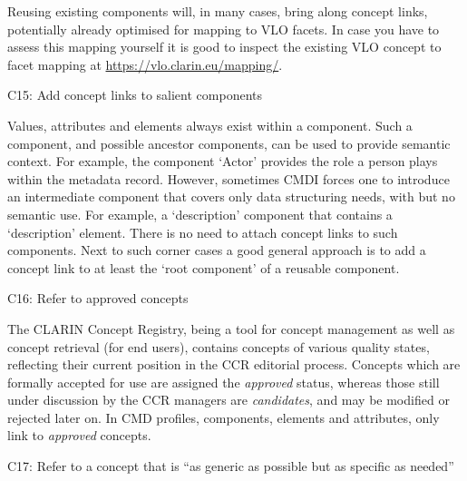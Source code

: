 Reusing existing components will, in many cases, bring along concept links, potentially already optimised for mapping to VLO facets. In case you have to assess this mapping yourself it is good to inspect the existing VLO concept to facet mapping at \url{https://vlo.clarin.eu/mapping/}.

\label{c15}
C15: Add concept links to salient components

 

Values, attributes and elements always exist within a component. Such a component, and possible ancestor components, can be used to provide semantic context. For example, the component `Actor' provides the role a person plays within the metadata record. However, sometimes CMDI forces one to introduce an intermediate component that covers only data
structuring needs, with but no semantic use. For example, a
`description' component that contains a `description' element. There is no need to attach concept links to such components. Next to such corner cases a good general approach is to add a concept link to at least the `root component' of a reusable component.

\begin{workinprogress}
C16: Refer to approved concepts

The CLARIN Concept Registry, being a tool for concept management as well as concept retrieval (for end users), contains concepts of various quality states, reflecting their current position in the CCR editorial process. Concepts which are formally accepted for use are assigned the \textit{approved} status, whereas those still under discussion by the CCR managers are \textit{candidates}, and may be modified or rejected  later on.  In CMD profiles, components, elements and attributes, only link to \textit{approved} concepts.

\end{workinprogress}

C17: Refer to a concept that is ``as generic as possible but as specific as needed''


